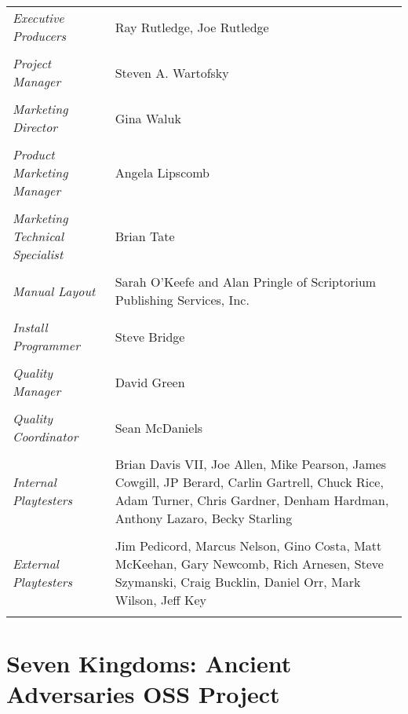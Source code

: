 \begin{tabular}{p{1in} p{3in}}
    \textit{Executive Producers} & Ray Rutledge, Joe Rutledge \\ \\
    \textit{Project Manager} & Steven A. Wartofsky \\ \\
    \textit{Marketing Director} & Gina Waluk \\ \\
    \textit{Product Marketing Manager} & Angela Lipscomb \\ \\
    \textit{Marketing Technical Specialist}    & Brian Tate \\ \\
    \textit{Manual Layout} & Sarah O’Keefe and Alan Pringle of Scriptorium Publishing Services, Inc. \\ \\
    \textit{Install Programmer}    & Steve Bridge \\ \\
    \textit{Quality Manager} & David Green \\ \\
    \textit{Quality Coordinator} & Sean McDaniels \\ \\
    \textit{Internal Playtesters} & Brian Davis VII, Joe Allen, Mike Pearson, James Cowgill, JP Berard, Carlin Gartrell, Chuck Rice, Adam Turner, Chris Gardner, Denham Hardman, Anthony Lazaro, Becky Starling \\ \\
    \textit{External Playtesters} & Jim Pedicord, Marcus Nelson, Gino Costa, Matt McKeehan, Gary Newcomb, Rich Arnesen, Steve Szymanski, Craig Bucklin, Daniel Orr, Mark Wilson, Jeff Key \\ \\
\end{tabular}

\clearpage

\section{Seven Kingdoms: Ancient Adversaries OSS Project}

